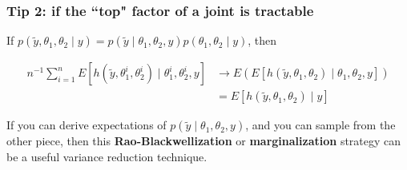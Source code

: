 \documentclass{beamer}
\begin{document}
\begin{frame}
\frametitle{Tip 2: if the ``top" factor of a joint is tractable}

If $p(\tilde{y}, \theta_1, \theta_2 \mid y) = p(\tilde{y} \mid \theta_1, \theta_2, y) p(\theta_1,  \theta_2 \mid y)$, then

\begin{align*}
n^{-1} \sum_{i=1}^n E[h(\tilde{y}, \theta_1^i, \theta_2^i)  \mid \theta_1^i, \theta_2^i, y] &\to E\left( E[h(\tilde{y}, \theta_1, \theta_2)  \mid \theta_1, \theta_2, y]\right) \\
&= E[h(\tilde{y}, \theta_1, \theta_2) \mid y]
\end{align*}

If you can derive expectations of $p(\tilde{y} \mid \theta_1, \theta_2, y)$, and you can sample from the other piece, then this {\bf Rao-Blackwellization} or {\bf marginalization} strategy can be a useful variance reduction technique.

\end{frame}
\end{document}
